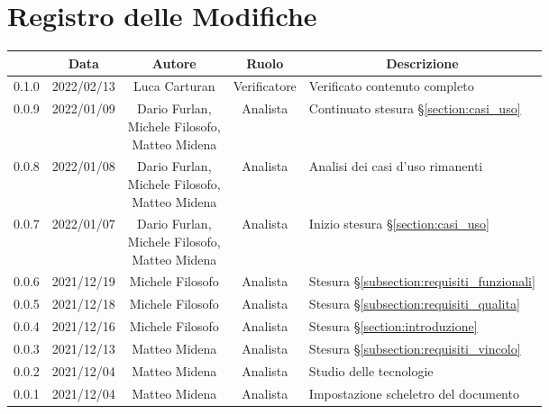 \thispagestyle{empty}
\section*{Registro delle Modifiche}

\begin{center}
	\renewcommand{\arraystretch}{1.8}
	\begin{longtable}[c]{c | c | c | c | p{5cm}}
		\rowcolor[HTML]{125E28}
		\multicolumn{1}{c}{\color[HTML]{FFFFFF} \textbf{Versione}} & 
		\multicolumn{1}{c}{\color[HTML]{FFFFFF} \textbf{Data}} & 
		\multicolumn{1}{c}{\color[HTML]{FFFFFF} \textbf{Autore}} & 
		\multicolumn{1}{c}{\color[HTML]{FFFFFF} \textbf{Ruolo}} & 
		\multicolumn{1}{c}{\color[HTML]{FFFFFF} \textbf{Descrizione}} \\
		\endhead
		0.1.0 & 2022/02/13 & Luca Carturan & Verificatore & Verificato contenuto completo \\
		0.0.9 & 2022/01/09 & \shortstack{Dario Furlan,\\ Michele Filosofo,\\ Matteo Midena} & Analista & Continuato stesura §\ref{section:casi_uso} \\
		0.0.8 & 2022/01/08 & \shortstack{Dario Furlan,\\ Michele Filosofo,\\ Matteo Midena} & Analista & Analisi dei casi d'uso rimanenti \\
		0.0.7 & 2022/01/07 & \shortstack{Dario Furlan,\\ Michele Filosofo,\\ Matteo Midena} & Analista & Inizio stesura §\ref{section:casi_uso} \\
		0.0.6 & 2021/12/19 & Michele Filosofo & Analista & Stesura §\ref{subsection:requisiti_funzionali} \\
		0.0.5 & 2021/12/18 & Michele Filosofo & Analista & Stesura §\ref{subsection:requisiti_qualita} \\
		0.0.4 & 2021/12/16 & Michele Filosofo & Analista & Stesura §\ref{section:introduzione} \\
		0.0.3 & 2021/12/13 & Matteo Midena & Analista & Stesura §\ref{subsection:requisiti_vincolo} \\
		0.0.2 & 2021/12/04 & Matteo Midena & Analista & Studio delle tecnologie\\
		0.0.1 & 2021/12/04 & Matteo Midena & Analista & Impostazione scheletro del documento\\
	\end{longtable}
\end{center}